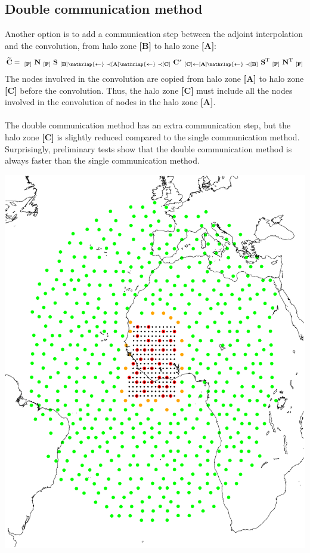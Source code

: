 \documentclass[12pt]{scrartcl}
\begin{document}
\subsection{Double communication method}
Another option is to add a communication step between the adjoint interpolation and the convolution, from halo zone \textbf{[B]} to halo zone \textbf{[A]}:
\begin{align}
\widetilde{\mathbf{C}} = \ _{\mathbf{[F]}} \ \mathbf{N} \ _{\mathbf{[F]}} \ \mathbf{S} \ _{\mathbf{[B]} \text{$\mathrlap{\boldsymbol{\leftarrow}}\boldsymbol{\prec}$} \mathbf{[A]} \text{$\mathrlap{\boldsymbol{\leftarrow}}\boldsymbol{\prec}$} \mathbf{[C]}} \ \mathbf{C}^s \ _{\mathbf{[C]} \boldsymbol{\leftarrow} \mathbf{[A]} \text{$\mathrlap{\boldsymbol{\leftarrow}}\boldsymbol{\prec}$} \mathbf{[B]}} \ \mathbf{S}^{\mathrm{T}} \ _{\mathbf{[F]}} \ \mathbf{N}^{\mathrm{T}} \ _{\mathbf{[F]}}
\end{align}
The nodes involved in the convolution are copied from halo zone \textbf{[A]} to halo zone \textbf{[C]} before the convolution. Thus, the halo zone \textbf{[C]} must include all the nodes involved in the convolution of nodes in the halo zone \textbf{[A]}.\\
$  $\\
The double communication method has an extra communication step, but the halo zone \textbf{[C]} is slightly reduced compared to the single communication method. Surprisingly, preliminary tests show that the double communication method is always faster than the single communication method.

\begin{center}
\includegraphics[height=0.6\linewidth]{arp_6B60_halo_2.pdf}
\end{center}
\end{document}
